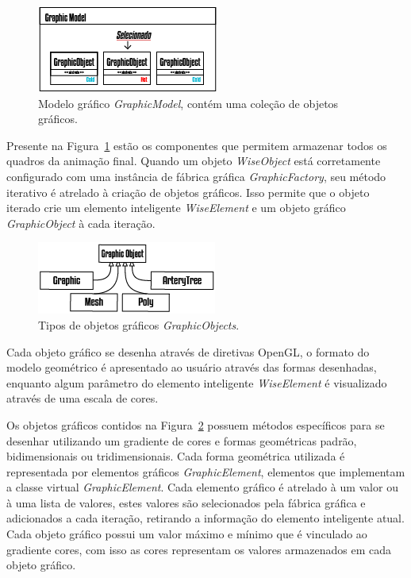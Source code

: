 \documentclass[
        english,			
        brazil			        %
        ,<...>]{abntbibufjf}
\begin{document}
\begin{figure}[!htbp]
	\centering
	\includegraphics[scale=1]{Figures/GraphicModel.png}
	\caption{Modelo gráfico \textit{GraphicModel}, contém uma coleção de objetos gráficos.}
	\label{fig7:graphicmodel}
\end{figure}

Presente na Figura~\ref{fig7:graphicmodel} estão os componentes que permitem armazenar todos os quadros da animação final. Quando um objeto \textit{WiseObject} está corretamente configurado com uma instância de fábrica gráfica \textit{GraphicFactory}, seu método iterativo é atrelado à criação de objetos gráficos. Isso permite que o objeto iterado crie um elemento inteligente \textit{WiseElement} e um objeto gráfico \textit{GraphicObject} à cada iteração.

\begin{figure}[!htbp]
	\centering
	\includegraphics[scale=1]{Figures/GraphicObjects}
	\caption{Tipos de objetos gráficos \textit{GraphicObjects}.}
	\label{fig7:graphicobjects}
\end{figure}

Cada objeto gráfico se desenha através de diretivas OpenGL, o formato do modelo geométrico é apresentado ao usuário através das formas desenhadas, enquanto algum parâmetro do elemento inteligente \textit{WiseElement} é visualizado através de uma escala de cores.

Os objetos gráficos contidos na Figura~\ref{fig7:graphicobjects} possuem métodos específicos para se desenhar utilizando um gradiente de cores e formas geométricas padrão, bidimensionais ou tridimensionais. Cada forma geométrica utilizada é representada por elementos gráficos \textit{GraphicElement}, elementos que implementam a classe virtual \textit{GraphicElement}. Cada elemento gráfico é atrelado à um valor ou à uma lista de valores, estes valores são selecionados pela fábrica gráfica e adicionados a cada iteração, retirando a informação do elemento inteligente atual. Cada objeto gráfico possui um valor máximo e mínimo que é vinculado ao gradiente cores, com isso as cores representam os valores armazenados em cada objeto gráfico.
\end{document}
